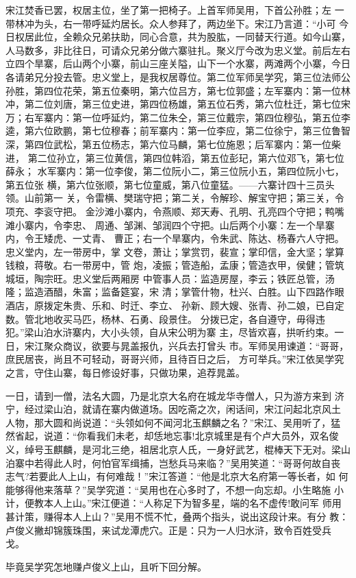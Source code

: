 宋江焚香已罢，权居主位，坐了第一把椅子。上首军师吴用，下首公孙胜；左
一带林冲为头，右一带呼延灼居长。众人参拜了，两边坐下。宋江乃言道：“小可
今日权居此位，全赖众兄弟扶助，同心合意，共为股肱，一同替天行道。如今山寨，
人马数多，非比往日，可请众兄弟分做六寨驻扎。聚义厅今改为忠义堂。前后左右
立四个旱寨，后山两个小寨，前山三座关隘，山下一个水寨，两滩两个小寨，今日
各请弟兄分投去管。忠义堂上，是我权居尊位。第二位军师吴学究，第三位法师公
孙胜，第四位花荣，第五位秦明，第六位吕方，第七位郭盛；左军寨内：第一位林
冲，第二位刘唐，第三位史进，第四位杨雄，第五位石秀，第六位杜迁，第七位宋
万；右军寨内：第一位呼延灼，第二位朱仝，第三位戴宗，第四位穆弘，第五位李
逵，第六位欧鹏，第七位穆春；前军寨内：第一位李应，第二位徐宁，第三位鲁智
深，第四位武松，第五位杨志，第六位马麟，第七位施恩；后军寨内：第一位柴进，
第二位孙立，第三位黄信，第四位韩滔，第五位彭玘，第六位邓飞，第七位薛永；
水军寨内：第一位李俊，第二位阮小二，第三位阮小五，第四位阮小七，第五位张
横，第六位张顺，第七位童威，第八位童猛。——六寨计四十三员头领。山前第一
关，令雷横、樊瑞守把；第二关，令解珍、解宝守把；第三关，令项充、李衮守把。
金沙滩小寨内，令燕顺、郑天寿、孔明、孔亮四个守把；鸭嘴滩小寨内，令李忠、
周通、邹渊、邹润四个守把。山后两个小寨：左一个旱寨内，令王矮虎、一丈青、
曹正；右一个旱寨内，令朱武、陈达、杨春六人守把。忠义堂内，左一带房中，掌
文卷，萧让；掌赏罚，裴宣；掌印信，金大坚；掌算钱粮，蒋敬。右一带房中，管
炮，凌振；管造船，孟康；管造衣甲，侯健；管筑城垣，陶宗旺。忠义堂后两厢房
中管事人员：监造房屋，李云；铁匠总管，汤隆；监造酒醋，朱富；监备筵宴，宋
清；掌管什物，杜兴、白胜。山下四路作眼酒店，原拨定朱贵、乐和、时迁、李立、
孙新、顾大嫂、张青、孙二娘，已自定数。管北地收买马匹，杨林、石勇、段景住。
分拨已定，各自遵守，毋得违犯。”梁山泊水浒寨内，大小头领，自从宋公明为寨
主，尽皆欢喜，拱听约束。一日，宋江聚众商议，欲要与晁盖报仇，兴兵去打曾头
市。军师吴用谏道：“哥哥，庶民居丧，尚且不可轻动，哥哥兴师，且待百日之后，
方可举兵。”宋江依吴学究之言，守住山寨，每日修设好事，只做功果，追荐晁盖。

一日，请到一僧，法名大圆，乃是北京大名府在城龙华寺僧人，只为游方来到
济宁，经过梁山泊，就请在寨内做道场。因吃斋之次，闲话间，宋江问起北京风土
人物，那大圆和尚说道：“头领如何不闻河北玉麒麟之名？”宋江、吴用听了，猛
然省起，说道：“你看我们未老，却恁地忘事!北京城里是有个卢大员外，双名俊
义，绰号玉麒麟，是河北三绝，祖居北京人氏，一身好武艺，棍棒天下无对。梁山
泊寨中若得此人时，何怕官军缉捕，岂愁兵马来临？”吴用笑道：“哥哥何故自丧
志气?若要此人上山，有何难哉！”宋江答道：“他是北京大名府第一等长者，如
何能够得他来落草？”吴学究道：“吴用也在心多时了，不想一向忘却。小生略施
小计，便教本人上山。”宋江便道：“人称足下为智多星，端的名不虚传!敢问军
师用甚计策，赚得本人上山？”吴用不慌不忙，叠两个指头，说出这段计来。有分
教：卢俊义撇却锦簇珠围，来试龙潭虎穴。正是：只为一人归水浒，致令百姓受兵
戈。

毕竟吴学究怎地赚卢俊义上山，且听下回分解。